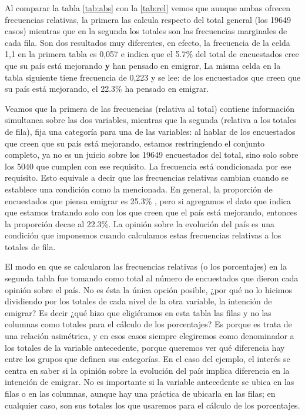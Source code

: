 \documentclass[]{book}
\begin{document}
Al comparar la tabla \ref{tab:abs} con la \ref{tab:rel} vemos que aunque ambas ofrecen frecuencias relativas, la primera las calcula respecto del total general (los
19649 casos) mientras que en la segunda los totales son las frecuencias marginales de cada fila. Son dos resultados muy diferentes, en efecto, la frecuencia de la celda 1,1 en la primera tabla es 0,057 e indica que el 5.7\% del total de encuestados cree que su país está mejorando \textbf{y} han pensado en emigrar, La misma celda en la tabla siguiente tiene frecuencia de 0,223 y se lee: de los encuestados que creen que su país está mejorando, el 22.3\% ha pensado en emigrar.

Veamos que la primera de las frecuencias (relativa al total) contiene
información simultanea sobre las dos variables, mientras que la segunda (relativa a los totales de fila), fija una categoría para una de las variables: al hablar de los encuestados que creen que su país está mejorando, estamos restringiendo el conjunto completo, ya no es un juicio sobre los 19649 encuestados del total, sino solo sobre los 5040 que cumplen con ese requisito. La frecuencia está condicionada por ese requisito. Esto equivale a decir que las frecuencias relativas cambian cuando se establece una condición como la mencionada. En general, la proporción de encuestados que piensa emigrar es 25.3\% , pero si agregamos el dato que indica que estamos tratando solo con los que creen que el país está mejorando, entonces la proporción decae al 22.3\%. La opinión sobre la evolución del país es una condición que imponemos cuando calculamos estas frecuencias relativas a los totales de fila.

El modo en que se calcularon las frecuencias relativas (o los
porcentajes) en la segunda tabla fue tomando como total al número de encuestados que dieron cada opinión sobre el país. No es ésta la única opción posible, ¿por qué no lo hicimos dividiendo por los totales de cada nivel de la otra variable, la intención de emigrar?
Es decir ¿qué hizo que eligiéramos en esta tabla las filas y no las
columnas como totales para el cálculo de los porcentajes? Es porque es trata de una relación asimétrica, y en esos casos siempre elegiremos como denominador a los totales de la variable
antecedente, porque queremos ver qué diferencia hay entre los grupos que definen sus categorías. En el caso del ejemplo, el interés se centra en saber si la opinión sobre la evolución del país implica diferencia en la intención de emigrar. No es importante si la variable antecedente se ubica en las filas o en las columnas, aunque hay una práctica de ubicarla en las filas; en cualquier caso, son sus totales los que usaremos para el cálculo de los porcentajes.
\end{document}
